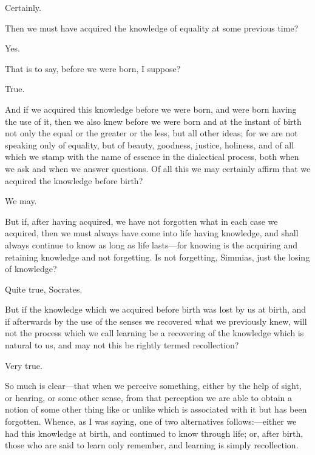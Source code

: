 \documentclass[11pt,letter]{article}
\begin{document}
\par  Certainly.

\par  Then we must have acquired the knowledge of equality at some previous time?

\par  Yes.

\par  That is to say, before we were born, I suppose?

\par  True.

\par  And if we acquired this knowledge before we were born, and were born having the use of it, then we also knew before we were born and at the instant of birth not only the equal or the greater or the less, but all other ideas; for we are not speaking only of equality, but of beauty, goodness, justice, holiness, and of all which we stamp with the name of essence in the dialectical process, both when we ask and when we answer questions. Of all this we may certainly affirm that we acquired the knowledge before birth?

\par  We may.

\par  But if, after having acquired, we have not forgotten what in each case we acquired, then we must always have come into life having knowledge, and shall always continue to know as long as life lasts—for knowing is the acquiring and retaining knowledge and not forgetting. Is not forgetting, Simmias, just the losing of knowledge?

\par  Quite true, Socrates.

\par  But if the knowledge which we acquired before birth was lost by us at birth, and if afterwards by the use of the senses we recovered what we previously knew, will not the process which we call learning be a recovering of the knowledge which is natural to us, and may not this be rightly termed recollection?

\par  Very true.

\par  So much is clear—that when we perceive something, either by the help of sight, or hearing, or some other sense, from that perception we are able to obtain a notion of some other thing like or unlike which is associated with it but has been forgotten. Whence, as I was saying, one of two alternatives follows:—either we had this knowledge at birth, and continued to know through life; or, after birth, those who are said to learn only remember, and learning is simply recollection.
\end{document}
